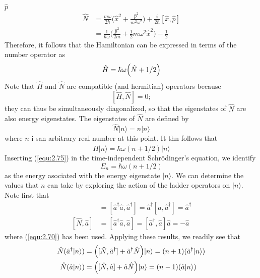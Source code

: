 $\hat{p}$
\begin{align}
  \hat{N} &= \frac{m\omega}{2\hbar} \biggl(\hat{x}^2 +
  \frac{\hat{p}^2}{m^2 \omega^2}\biggr) +
  \frac{i}{2\hbar}[\hat{x},  \hat{p}] \nonumber \\
  &=
  \frac{1}{\hbar\omega}\biggl(\frac{\hat{p}^2}{2m}+\frac{1}{2}m\omega^2
  \hat{x}^2\biggr) - \frac{1}{2} \label{equ:2.72}
\end{align}
Therefore, it follows that the Hamiltonian can be expressed
in terms of the number operator as
\begin{equation}
  \hat{H} = \hbar\omega \Bigl(\hat{N}+1/2\Bigr)
  \label{equ:2.73}
\end{equation}
Note that $\hat{H}$ and $\hat{N}$ are compatible (and
hermitian) operators because
$$
[\hat{H},  \hat{N}] = 0;
$$
they can thus be simultaneously diagonalized, so that the
eigenstates of $\hat{N}$ are also energy eigenstates.
The eigenstates of $\hat{N}$ are defined by
\begin{equation}
  \hat{N} \vert n\rangle = n \vert n\rangle 
  \label{equ:2.74}
\end{equation}
where $n$ i san arbitrary real number at this point. It thn
follows that
\begin{equation}
  \hat{H} \vert n\rangle  = \hbar\omega (n+1/2)\vert n\rangle 
  \label{equ:2.75}
\end{equation}
Inserting (\ref{equ:2.75}) in the time-independent
Schrödinger's equation, we identify
$$
E_n = \hbar\omega (n+1/2)
$$
as the energy asociated with the energy eigenstate $\vert n\rangle $.
We can determine the values that $n$ can take by exploring
the action of the ladder operators on $\vert n\rangle $. Note first that
\begin{align}
  [\hat{N}, \hat{a}^{\dagger}] &=
  [\hat{a}^{\dagger}\hat{a},\hat{a}^{\dagger}] =
  \hat{a}^{\dagger}[\hat{a}, \hat{a}^{\dagger}] =
  \hat{a}^{\dagger} \nonumber\\
  [\hat{N}, \hat{a}] &= [\hat{a}^{\dagger}\hat{a}, \hat{a}]
  = [\hat{a}^{\dagger}, \hat{a}] \hat{a}=  - \hat{a}
  \label{equ:2.76}
\end{align}
where (\ref{equ:2.70}) has been used. Applying these
results, we readily see that
\begin{subequations}
  \begin{align}
    \hat{N} (\hat{a}^{\dagger} \vert n\rangle ) &=
    \Bigl([\hat{N},\hat{a}^{\dagger}]+\hat{a}^{\dagger}\hat{N}\Bigr)\vert n\rangle 
    = (n+1)(\hat{a}^{\dagger} \vert n\rangle ) \label{equ:2.77a} \\
    \hat{N}(\hat{a}\vert n\rangle ) &= \Bigl([\hat{N},
  \hat{a}]+\hat{a}\hat{N}\Bigr) \vert n\rangle  = (n-1) (\hat{a}\vert n\rangle )
  \label{equ:2.77b}
  \end{align}
\end{subequations}
